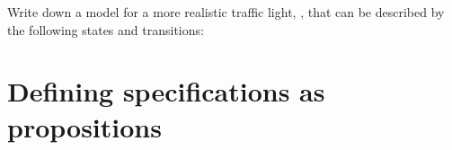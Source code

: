 \begin{exc}
Write down a model for a more realistic traffic light, \ie{}, that can
be described by the following states and transitions:
%

\begin{center}
\end{center}
\end{exc}

\section{Defining specifications as propositions}
\label{sec:spec}

